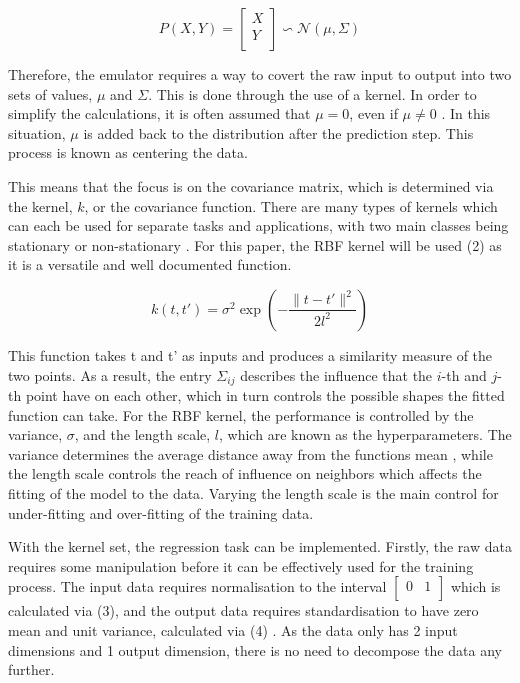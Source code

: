 \documentclass[conference]{IEEEtran}
\begin{document}
\begin{equation}
    P(X,Y) = \begin{bmatrix}
    X \\
    Y \\
    \end{bmatrix} \backsim \mathcal{N} (\mu,\Sigma)
    \label{eq:GP}
\end{equation}

Therefore, the emulator requires a way to covert the raw input to output into two sets of values, $\mu$ and $\Sigma$. This is done through the use of a kernel. In order to simplify the calculations, it is often assumed that $\mu = 0$, even if $\mu \neq 0$ \cite{gortler_visual_2019}. In this situation, $\mu$ is added back to the distribution after the prediction step. This process is known as centering the data.

This means that the focus is on the covariance matrix, which is determined via the kernel, $k$, or the covariance function. There are many types of kernels which can each be used for separate tasks and applications, with two main classes being stationary or non-stationary \cite{rasmussen_gaussian_2006}. For this paper, the RBF kernel will be used (2) as it is a versatile and well documented function.

\begin{equation}
    k(t,t') = \sigma^2\exp\left(-\frac{\lVert t - t' \rVert^2}{2l^2}\right)
\end{equation}

This function takes t and t' as inputs and produces a similarity measure of the two points. As a result, the entry $\Sigma_{ij}$ describes the influence that the $i$-th and $j$-th point have on each other, which in turn controls the possible shapes the fitted function can take. For the RBF kernel, the performance is controlled by the variance, $\sigma$, and the length scale, $l$, which are known as the hyperparameters. The variance determines the average distance away from the functions mean \cite{gortler_visual_2019}, while the length scale controls the reach of influence on neighbors which affects the fitting of the model to the data. Varying the length scale is the main control for under-fitting and over-fitting of the training data.

With the kernel set, the regression task can be implemented. Firstly, the raw data requires some manipulation before it can be effectively used for the training process. The input data requires normalisation to the interval $\begin{bmatrix}
    0 & 1 \\
\end{bmatrix}$ which is calculated via (3), and the output data requires standardisation to have zero mean and unit variance, calculated via (4) \cite{moonen_employing_2015}. As the data only has 2 input dimensions and 1 output dimension, there is no need to decompose the data any further.
\end{document}
